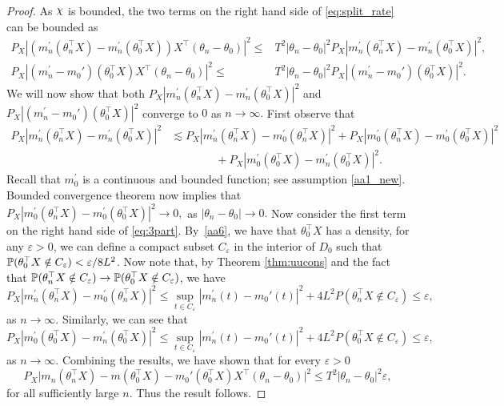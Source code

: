 \begin{proof}
As $\rchi$ is bounded, the two terms on the right hand side of \eqref{eq:split_rate} can be bounded as
\begin{align*}
P_X\left|(m_n^{\prime}(\theta_n^{\top}X)- m_n^{\prime}(\theta_0^{\top}X)) X^{\top}(\theta_n - \theta_0)\right|^2
\le&T^2 |\theta_n - \theta_0|^2 P_X\left|m_n^{\prime}(\theta_n^{\top}X)- m_n^{\prime}(\theta_0^{\top}X) \right|^2,\\
 P_X\left| (m_n^{\prime}- m_0')(\theta_0^{\top}X)X^{\top}(\theta_n - \theta_0)\right|^2  \le& T^2 |\theta_n - \theta_0|^2 P_X\left| (m_n^{\prime}- m_0')(\theta_0^{\top}X)\right|^2.
\end{align*}
We will now show that both $P_X\left|m_n^{\prime}(\theta_n^{\top}X)- m_n^{\prime}(\theta_0^{\top}X) \right|^2$ and $P_X\left| (m_n^{\prime}- m_0')(\theta_0^{\top}X)\right|^2$ converge to $0$ as $n\rightarrow \infty.$ First observe that
\begin{align}
P_X\left|m_n^{\prime}(\theta_n^{\top}X)- m_n^{\prime}(\theta_0^{\top}X) \right|^2 &\lesssim  P_X\left|m_n^{\prime}(\theta_n^{\top}X)- m_0^{\prime}(\theta_n^{\top}X) \right|^2 + P_X\left|m_0^{\prime}(\theta_n^{\top}X)- m_0^{\prime}(\theta_0^{\top}X) \right|^2\nonumber\\
 & \qquad \qquad+ P_X\left|m_0^{\prime}(\theta_0^{\top}X)- m_n^{\prime}(\theta_0^{\top}X) \right|^2.\label{eq:3part}
\end{align}
Recall that $m_0^\prime$ is a continuous  and bounded function; see assumption \ref{aa1_new}. Bounded convergence theorem now implies that $P_X\left|m_0^{\prime}(\theta_n^{\top}X)- m_0^{\prime}(\theta_0^{\top}X) \right|^2 \rightarrow 0,$ as $|\theta_n-\theta_0| \rightarrow 0.$ Now consider the first term on the right hand side of \eqref{eq:3part}.  {By~\ref{aa6}, we have that $\theta_0^\top X$ has a density, for any $\varepsilon >0$, we can define a compact subset $C_\varepsilon$ in the interior of $D_0$  such that $\mathbb{P}(\theta_0^\top X \notin C_\varepsilon)  < \varepsilon/8L^2$}. Now note that, by Theorem \ref{thm:uucons} and the fact that $\mathbb{P}(\theta_n^\top X \notin C_\varepsilon) \rightarrow  \mathbb{P}(\theta_0^\top X \notin C_\varepsilon)$, we have
\[P_X\left|m_n^{\prime}(\theta_n^{\top}X)- m_0^{\prime}(\theta_n^{\top}X) \right|^2 \le \sup_{t\in C_\varepsilon} |m_n^\prime(t)- m_0'(t)|^2 + 4L^2  P(\theta_n^\top X \notin C_{\varepsilon}) \le \varepsilon,\] as $n\rightarrow \infty.$ Similarly, we can see that
\[P_X\left|m_0^{\prime}(\theta_0^{\top}X)- m_n^{\prime}(\theta_0^{\top}X) \right|^2 \le \sup_{t\in C_\varepsilon} |m_n^\prime(t)- m_0'(t)|^2 + 4L^2  P(\theta_0^\top X \notin C_{\varepsilon}) \le \varepsilon,\] as $n\rightarrow \infty$. Combining the results, we have shown that for every $\varepsilon>0$
\[
P_X\big|m_n(\theta_n^{\top}X) - m(\theta_0^{\top}X) - m_0'(\theta_0^{\top}X)X^{\top}(\theta_n - \theta_0)\big|^2 \le T^2 |\theta_n - \theta_0|^2 \varepsilon,\] for all sufficiently large $n.$ Thus the result follows.\qedhere






\end{proof}
